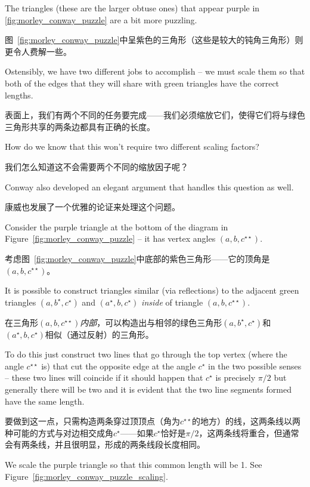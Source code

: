 The triangles (these are the larger obtuse ones) that appear purple in \ref{fig:morley_conway_puzzle} are 
a bit more puzzling.

图~\ref{fig:morley_conway_puzzle}中呈紫色的三角形（这些是较大的钝角三角形）则更令人费解一些。

Ostensibly, we have two different jobs to accomplish --
we must scale them so that both of the edges that they will share
with green triangles have the correct lengths.

表面上，我们有两个不同的任务要完成——我们必须缩放它们，使得它们将与绿色三角形共享的两条边都具有正确的长度。

How do we know
that this won't require two different scaling factors?

我们怎么知道这不会需要两个不同的缩放因子呢？

Conway also
developed an elegant argument that handles this question as well.

康威也发展了一个优雅的论证来处理这个问题。

Consider the purple triangle at the bottom of the 
diagram in Figure~\ref{fig:morley_conway_puzzle} -- it has vertex
angles $(a,b,c^{\star\star})$.

考虑图~\ref{fig:morley_conway_puzzle}中底部的紫色三角形——它的顶角是$(a,b,c^{\star\star})$。

It is possible to construct triangles
similar (via reflections) to the adjacent green triangles 
$(a, b^\star, c^\star)$ and $(a^\star, b, c^\star)$ \emph{inside} of
triangle $(a,b,c^{\star\star})$.

在三角形$(a,b,c^{\star\star})$\emph{内部}，可以构造出与相邻的绿色三角形$(a, b^\star, c^\star)$和$(a^\star, b, c^\star)$相似（通过反射）的三角形。

To do this just construct two lines that
go through the top vertex (where the angle $c^{\star\star}$ is) that cut
the opposite edge at the angle $c^\star$ in the two possible senses -- 
these two lines
will coincide if it should happen that $c^\star$ is precisely $\pi/2$
but generally there will be two and it is evident that the two line
segments formed have the same length.

要做到这一点，只需构造两条穿过顶顶点（角为$c^{\star\star}$的地方）的线，这两条线以两种可能的方式与对边相交成角$c^\star$——如果$c^\star$恰好是$\pi/2$，这两条线将重合，但通常会有两条线，并且很明显，形成的两条线段长度相同。

We scale the purple triangle so
that this common length will be 1.  See Figure~\ref{fig:morley_conway_puzzle_scaling}.


